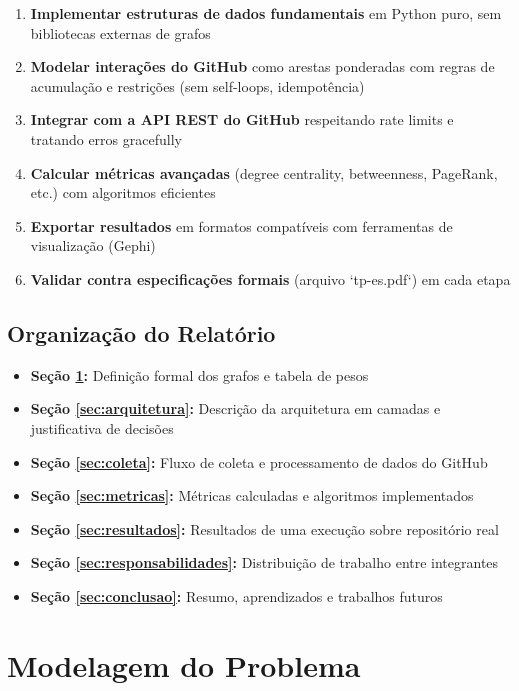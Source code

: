 \documentclass[12pt,a4paper]{article}
\begin{document}
\begin{enumerate}
  \item \textbf{Implementar estruturas de dados fundamentais} em Python puro, sem bibliotecas externas de grafos
  \item \textbf{Modelar interações do GitHub} como arestas ponderadas com regras de acumulação e restrições (sem self-loops, idempotência)
  \item \textbf{Integrar com a API REST do GitHub} respeitando rate limits e tratando erros gracefully
  \item \textbf{Calcular métricas avançadas} (degree centrality, betweenness, PageRank, etc.) com algoritmos eficientes
  \item \textbf{Exportar resultados} em formatos compatíveis com ferramentas de visualização (Gephi)
  \item \textbf{Validar contra especificações formais} (arquivo `tp-es.pdf`) em cada etapa
\end{enumerate}

\subsection{Organização do Relatório}

\begin{itemize}
  \item \textbf{Seção \ref{sec:modelagem}:} Definição formal dos grafos e tabela de pesos
  \item \textbf{Seção \ref{sec:arquitetura}:} Descrição da arquitetura em camadas e justificativa de decisões
  \item \textbf{Seção \ref{sec:coleta}:} Fluxo de coleta e processamento de dados do GitHub
  \item \textbf{Seção \ref{sec:metricas}:} Métricas calculadas e algoritmos implementados
  \item \textbf{Seção \ref{sec:resultados}:} Resultados de uma execução sobre repositório real
  \item \textbf{Seção \ref{sec:responsabilidades}:} Distribuição de trabalho entre integrantes
  \item \textbf{Seção \ref{sec:conclusao}:} Resumo, aprendizados e trabalhos futuros
\end{itemize}

\section{Modelagem do Problema}\label{sec:modelagem}
\end{document}
